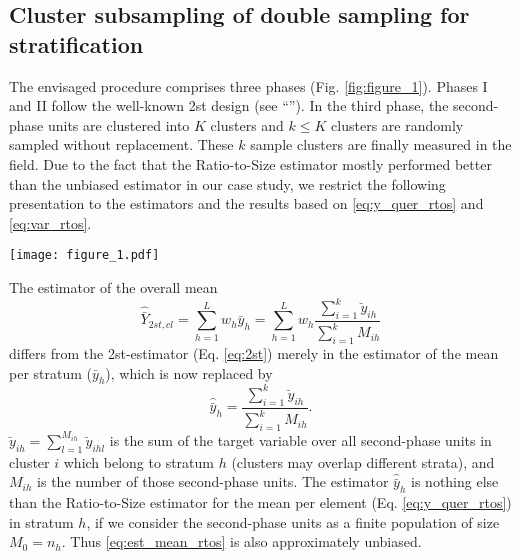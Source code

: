 \subsection{Cluster subsampling of double sampling for stratification}
The envisaged procedure comprises three phases (Fig. \ref{fig:figure_1}). Phases I and II follow the well-known 2st design (see ``''). In the third phase, the second-phase units are clustered into $K$ clusters and $k \leq K$ clusters are randomly sampled without replacement. These $k$ sample clusters are finally measured in the field. Due to the fact that the Ratio-to-Size estimator mostly performed better than the unbiased estimator in our case study, we restrict the following presentation to the estimators and the results based on \eqref{eq:y_quer_rtos} and \eqref{eq:var_rtos}.
\begin{figure*}
  \texttt{[image: figure\_1.pdf]}
\caption{Sampling procedure of the three-phase sampling design.}
\label{fig:figure_1}
\end{figure*}
The estimator of the overall mean 
\begin{equation}
\hat{\bar{Y}}_{2st,cl}=\sum_{h=1}^{L}w_h\hat{\bar{y}}_h=\sum_{h=1}^{L}w_h\frac{\sum_{i=1}^k \breve{y}_{ih}}{\sum_{i=1}^k M_{ih}}
\label{eq:est_mean_rtos}
\end{equation}
differs from the 2st-estimator (Eq. \ref{eq:2st}) merely in the estimator of the mean per stratum ($\bar{y}_h$), which is now replaced by 
\begin{equation}
\hat{\bar{y}}_h=\frac{\sum_{i=1}^k \breve{y}_{ih}}{\sum_{i=1}^k M_{ih}}.
\label{eq:est_mean_strat_rts}
\end{equation}
$\breve{y}_{ih}=\sum_{l=1}^{M_{ih}}\breve{y}_{ihl}$ is the sum of the target variable over all second-phase units in cluster $i$ which belong to stratum $h$ (clusters may overlap different strata), and $M_{ih}$ is the number of those second-phase units. The estimator $\hat{\bar{y}}_h$ is nothing else than the Ratio-to-Size estimator for the mean per element (Eq. \ref{eq:y_quer_rtos}) in stratum $h$, if we consider the second-phase units as a finite population of size $M_0=n_h$. Thus \eqref{eq:est_mean_rtos} is also approximately unbiased.

